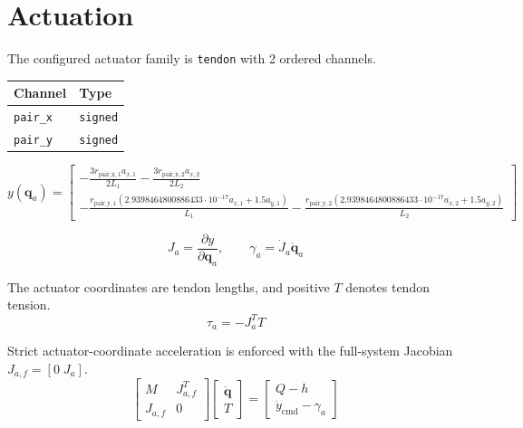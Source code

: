 \documentclass[11pt]{article}
\begin{document}
\section{Actuation}
The configured actuator family is \texttt{tendon} with 2 ordered channels.
\begin{center}
\begin{tabular}{ll}
\hline
Channel & Type \\
\hline
\texttt{pair\_x} & \texttt{signed} \\
\texttt{pair\_y} & \texttt{signed} \\
\hline
\end{tabular}
\end{center}
\begin{equation}
y(\boldsymbol q_a)=\begin{bmatrix}- \frac{3 r_{\mathrm{pair\_x},1} a_{x,1}}{2 L_{1}} - \frac{3 r_{\mathrm{pair\_x},2} a_{x,2}}{2 L_{2}}\\- \frac{r_{\mathrm{pair\_y},1} \left(2.9398464800886433 \cdot 10^{-17} a_{x,1} + 1.5 a_{y,1}\right)}{L_{1}} - \frac{r_{\mathrm{pair\_y},2} \left(2.9398464800886433 \cdot 10^{-17} a_{x,2} + 1.5 a_{y,2}\right)}{L_{2}}\end{bmatrix}
\end{equation}

\begin{equation}
J_a=\frac{\partial y}{\partial\boldsymbol q_a},\qquad \gamma_a=\dot J_a\dot{\boldsymbol q}_a
\end{equation}

The actuator coordinates are tendon lengths, and positive $T$ denotes tendon tension.
\begin{equation}
\tau_a=-J_a^TT
\end{equation}

Strict actuator-coordinate acceleration is enforced with the full-system Jacobian $J_{a,f}=[0\;J_a]$.
\begin{equation}
\begin{bmatrix}M&J_{a,f}^{T}\\J_{a,f}&0\end{bmatrix}\begin{bmatrix}\ddot{\boldsymbol q}\\T\end{bmatrix}=\begin{bmatrix}Q-h\\\ddot y_{\mathrm{cmd}}-\gamma_a\end{bmatrix}
\end{equation}
\end{document}
